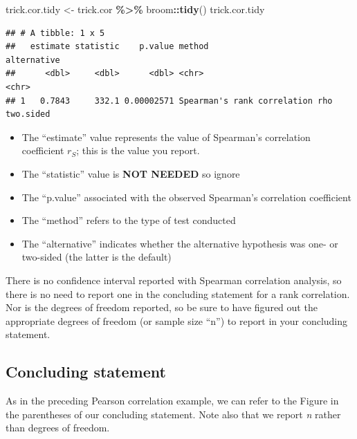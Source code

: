 \documentclass[
]{book}
\newenvironment{Shaded}{\begin{snugshade}}{\end{snugshade}}
\newcommand{\FunctionTok}[1]{\textcolor[rgb]{0.13,0.29,0.53}{\textbf{#1}}}
\newcommand{\NormalTok}[1]{#1}
\newcommand{\OtherTok}[1]{\textcolor[rgb]{0.56,0.35,0.01}{#1}}
\newcommand{\SpecialCharTok}[1]{\textcolor[rgb]{0.81,0.36,0.00}{\textbf{#1}}}
\providecommand{\tightlist}{%
  \setlength{\itemsep}{0pt}\setlength{\parskip}{0pt}}
\begin{document}
\begin{Shaded}
\begin{Highlighting}[]
\NormalTok{trick.cor.tidy }\OtherTok{\textless{}{-}}\NormalTok{ trick.cor }\SpecialCharTok{\%\textgreater{}\%}
\NormalTok{  broom}\SpecialCharTok{::}\FunctionTok{tidy}\NormalTok{()}
\NormalTok{trick.cor.tidy}
\end{Highlighting}
\end{Shaded}

\begin{verbatim}
## # A tibble: 1 x 5
##   estimate statistic    p.value method                          alternative
##      <dbl>     <dbl>      <dbl> <chr>                           <chr>      
## 1   0.7843     332.1 0.00002571 Spearman's rank correlation rho two.sided
\end{verbatim}

\begin{itemize}
\tightlist
\item
  The ``estimate'' value represents the value of Spearman's correlation coefficient \(r_S\); this is the value you report.
\item
  The ``statistic'' value is \textbf{NOT NEEDED} so ignore
\item
  The ``p.value'' associated with the observed Spearman's correlation coefficient
\item
  The ``method'' refers to the type of test conducted
\item
  The ``alternative'' indicates whether the alternative hypothesis was one- or two-sided (the latter is the default)
\end{itemize}

There is no confidence interval reported with Spearman correlation analysis, so there is no need to report one in the concluding statement for a rank correlation. Nor is the degrees of freedom reported, so be sure to have figured out the appropriate degrees of freedom (or sample size ``n'') to report in your concluding statement.

\subsection{Concluding statement}\label{spear_conclude}

As in the preceding Pearson correlation example, we can refer to the Figure in the parentheses of our concluding statement. Note also that we report \emph{n} rather than degrees of freedom.
\end{document}
